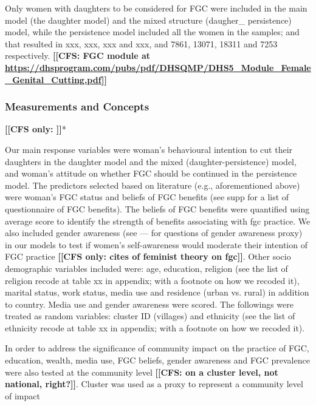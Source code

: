 \documentclass[12pt,]{article}
\newcommand{\comment}[1]{\textbf{[[#1]]}}
\newcommand{\cfcmt}[1]{\comment{CFS: #1}}
\newcommand{\cfonly}[1]{\comment{CFS only: #1}}
\begin{document}
Only women with daughters to be considered for FGC were included in the main model (the daughter model) and the mixed structure (daugher_ persistence) model, while the persistence model included all the women in the samples; and that resulted in xxx, xxx, xxx and xxx, and 7861, 13071, 18311 and 7253 respectively.  \cfcmt{FGC module at \url{https://dhsprogram.com/pubs/pdf/DHSQMP/DHS5_Module_Female_Genital_Cutting.pdf}}

\subsubsection{Measurements and Concepts}\label{measurements-and-concepts}

\cfonly{\cite{Rima08}}*

Our main response variables were woman's behavioural intention to cut their daughters in the daughter model and the mixed (daughter-persistence) model, and woman's attitude on whether FGC should be continued in the persistence model.  The predictors selected based on literature (e.g., aforementioned above) were woman's FGC status and beliefs of FGC benefits (see supp for a list of questionnaire of FGC benefits).  The beliefs of FGC benefits were quantified using average score  to identify the strength of benefits associating with fgc practice. We also included gender awareness (see — for questions of gender awareness proxy) in our models to test if women’s self-awareness would moderate  their intention of FGC practice \cfonly{cites of feminist theory on fgc}. Other socio demographic variables included were:  age, education, religion (see the list of religion recode at table xx in appendix; with a footnote on how we recoded it), marital status, work status, media use and residence (urban vs. rural) in addition to country.  Media use and gender awareness were scored.  The followings were treated as random variables:  cluster ID (villages) and ethnicity (see the list of ethnicity recode at table xx in appendix; with a footnote on how we recoded it).

In order to address the significance of community impact on the practice of FGC, education, wealth, media use, FGC beliefs, gender awareness and FGC prevalence were also tested at the community level \cfcmt{on a cluster level, not national, right?}.  Cluster  was used as a proxy to represent a community level of impact \cite{AligRen06, Hayf05, Krav02}
\end{document}
